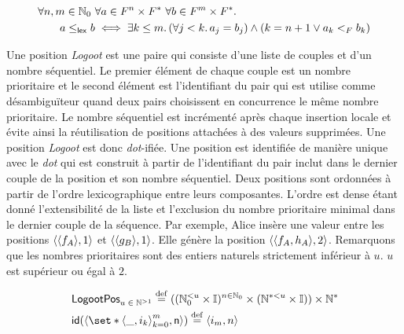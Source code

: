 \begin{equation*}\begin{split}
\MoveEqLeft \forall n, m \in \mathbb{N}_0\ \forall a \in F^n \times F^*\ \forall b \in F^m \times F^* \qsep\\
&a \leq_{\trm{lex}} b \iff \exists k \leq m \qsep (\forall j < k \qsep a_j = b_j) \land (k = n + 1 \lor a_k <_F b_k)
\end{split}\end{equation*}

Une position \emph{Logoot} est une paire qui consiste d'une liste de couples et d'un nombre séquentiel.
Le premier élément de chaque couple est un nombre prioritaire et le second élément est l'identifiant du pair qui est utilise comme désambiguïteur quand deux pairs choisissent en concurrence le même nombre prioritaire.
Le nombre séquentiel est incrémenté après chaque insertion locale et évite ainsi la réutilisation de positions attachées à des valeurs supprimées.
Une position \emph{Logoot} est donc \emph{dot}-ifiée.
Une position est identifiée de manière unique avec le \emph{dot} qui est construit à partir de l'identifiant du pair inclut dans le dernier couple de la position et son nombre séquentiel.
Deux positions sont ordonnées à partir de l'ordre lexicographique entre leurs composantes.
L'ordre est dense étant donné l'extensibilité de la liste et l'exclusion du nombre prioritaire minimal dans le dernier couple de la séquence.
Par exemple, Alice insère une valeur entre les positions $\tuple*{\tuple*{f_A}, 1}$ et $\tuple*{\tuple*{g_B}, 1}$.
Elle génère la position $\tuple*{\tuple*{f_A, h_A}, 2}$.
Remarquons que les nombres prioritaires sont des entiers naturels strictement inférieur à $u$.
$u$ est supérieur ou égal à $2$.

\begin{equation*}\begin{split}
&\trm{LogootPos}_{u\;\in\;\mathbb{N}^{> 1}} \defeq ((\mathbb{N}_0^{< u} \times \mathbb{I})^{n \in \mathbb{N}_0} \times (\mathbb{N}^{* < u} \times \mathbb{I})) \times \mathbb{N}^*\\
&\trm{id}(\tuple*{\set*{\tuple*{\_, i_k}}_{k=0}^m, \trm{n}}) \defeq \tuple*{i_m, n}
\end{split}\end{equation*}

